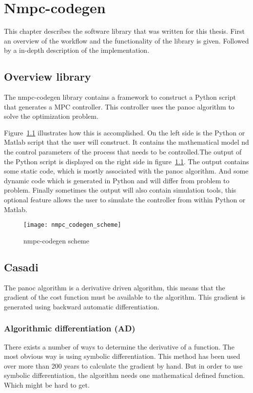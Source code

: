 \chapter{Nmpc-codegen}
This chapter describes the software library that was written for this thesis. First an overview of the workflow and the functionality of the library is given. Followed by a in-depth description of the implementation.
\section{Overview library}
The nmpc-codegen library contains a framework to construct a Python script that generates a MPC controller. This controller uses the panoc algorithm to solve the optimization problem.

Figure~\ref{fig:nmpc-codegen scheme} illustrates how this is accomplished. On the left side is the Python or Matlab script that the user will construct. It contains the mathematical model nd the control parameters of the process that needs to be controlled.The output of the Python script is displayed on the right side in figure~\ref{fig:nmpc-codegen scheme}. The output contains some static code, which is mostly associated with the panoc algorithm. And some dynamic code which is generated in Python and will differ from problem to problem. Finally sometimes the output will also contain simulation tools, this optional feature allows the user to simulate the controller from within Python or Matlab.
	\begin{figure}[H]
		\centering
		\texttt{[image: nmpc\_codegen\_scheme]}
		\caption{nmpc-codegen scheme}
		\label{fig:nmpc-codegen scheme}
	\end{figure}

\section{Casadi}
The panoc algorithm is a derivative driven algorithm, this means that the gradient of the cost function must be available to the algorithm. This gradient is generated using backward automatic differentiation.

\subsection{Algorithmic differentiation (AD)}
There exists a number of ways to determine the derivative of a function. The most obvious way is using symbolic differentiation. This method has been used over more than 200 years to calculate the gradient by hand. But in order to use symbolic differentiation, the algorithm needs one mathematical defined function. Which might be hard to get.

